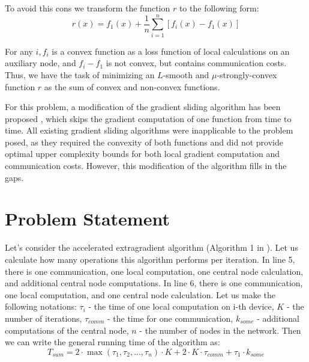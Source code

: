 \documentclass{article}
\begin{document}
To avoid this cons we transform the function $r$ to the following form:\\
\begin{equation}
    \label{eq:2}
    r(x) = f_1(x) + \frac{1}{n}\sum\limits_{i = 1}^{n}[f_i(x) - f_1(x)]
\end{equation}

For any $i, f_i$ is a convex function as a loss function of local calculations on an auxiliary node, and $f_i-f_1$ is not convex, but contains communication costs. Thus, we have the task of minimizing an $L$-smooth and $\mu$-strongly-convex function $r$ as the sum of convex and non-convex functions.

For this problem, a modification of the gradient sliding algorithm has been proposed \cite{kovalev2022optimal}, which skips the gradient computation of one function from time to time. All existing gradient sliding algorithms were inapplicable to the problem posed, as they required the convexity of both functions and did not provide optimal upper complexity bounds for both local gradient computation and communication costs. However, this modification of the algorithm fills in the gaps. 

\section{Problem Statement}

Let's consider the accelerated extragradient algorithm (Algorithm 1 in \cite{kovalev2022optimal}). Let us calculate how many operations this algorithm performs per iteration. In line 5, there is one communication, one local computation, one central node calculation, and additional central node computations. In line 6, there is one communication, one local computation, and one central node calculation. Let us make the following notations: $\tau_i$ - the time of one local computation on i-th device, $K$ - the number of iterations, $\tau_{comm}$ - the time for one communication, $k_{some}$ - additional computations of the central node, $n$ - the number of nodes in the network. Then we can write the general running time of the algorithm as:\\
\begin{equation}
    \label{eq:3}
    T_{sum} = 2\cdot\max(\tau_1, \tau_2, ..., \tau_n)\cdot K + 2\cdot K\cdot\tau_{comm} + \tau_1\cdot k_{some}
\end{equation}
\end{document}
